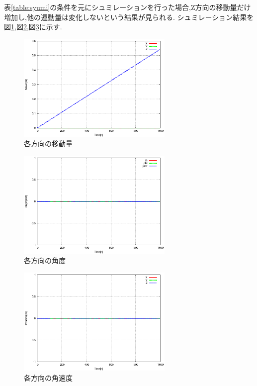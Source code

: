 \documentclass[12pt,oneside]{sotsuken_paper}
\begin{document}
表\ref{table:syumi}の条件を元にシュミレーションを行った場合,Z方向の移動量だけ増加し,他の運動量は変化しないという結果が見られる.
シュミレーション結果を図\ref{fig:UVW},図\ref{fig:tpy},図\ref{fig:XYZ}に示す.

\begin{figure}[htbp]
	\begin{center}
		\includegraphics[width=75mm]{image/simulation/UVW.eps}
		\caption{各方向の移動量}
		\label{fig:UVW}
	\end{center}
\end{figure}

\begin{figure}[htbp]
	\begin{center}
		\includegraphics[width=75mm]{image/simulation/tpy.eps}
		\caption{各方向の角度}
		\label{fig:tpy}
	\end{center}
\end{figure}

\begin{figure}[htbp]
	\begin{center}
		\includegraphics[width=75mm]{image/simulation/XYZ.eps}
		\caption{各方向の角速度}
		\label{fig:XYZ}
	\end{center}
\end{figure}
\end{document}
